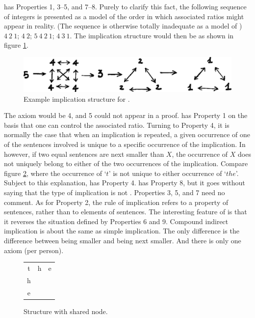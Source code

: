  has Properties 1, 3--5, and 7--8. Purely to clarify this fact, the 
following sequence of integers is presented as a model of the order in which 
associated ratios might appear in reality. (The sequence is otherwise totally 
inadequate as a model of ) $4\medspace2\medspace1$; $4\medspace2$; $5\medspace4\medspace2\medspace1$; $4\medspace3\medspace1$. The 
implication structure would then be as shown in figure \ref{illusionstructure}.

\begin{figure}
	{\centering \includegraphics[width=4.5in]{img/illusionstructure} \par}
	\caption{Example implication structure for .}
	\label{illusionstructure}
\end{figure}

The axiom would be 4, and 5 could not appear in a proof.  has 
Property 1 on the basis that one can control the associated ratio. Turning to 
Property 4, it is normally the case that when an implication is repeated, a 
given occurrence of one of the sentences involved is unique to a specific 
occurrence of the implication. In  however, if two equal 
sentences are next smaller than $X$, the occurrence of $X$ does not uniquely 
belong to either of the two occurrences of the implication. Compare figure \ref{thestructure},
where the occurrence of `$t$' is not unique to either occurrence of `$the$'. 
Subject to this explanation,  has Property 4.  has 
Property 8, but it goes without saying that the type of implication is not 
. Properties 3, 5, and 7 need no comment. As for Property 2, 
the rule of implication refers to a property of sentences, rather than to 
elements of sentences. The interesting feature of  is that it 
reverses the situation defined by Properties 6 and 9. Compound indirect 
implication is about the same as simple implication. The only difference is 
the difference between being smaller and being next smaller. And there is 
only one axiom (per person). 

\begin{figure}
	{\centering \setlength\tabcolsep{0.25em}
	\begin{tabular}{c c c} t & h & e \\ h &   &   \\ e &   & \end{tabular} \par}
	\caption{Structure with shared node.}
	\label{thestructure}
\end{figure}


